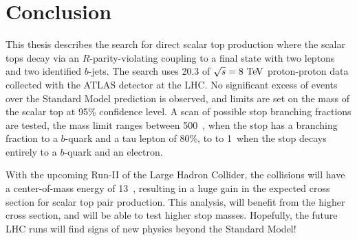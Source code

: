 \chapter[Conclusion][Conclusion]{Conclusion}

This thesis describes the search for direct scalar top production where the
scalar tops decay via an $R$-parity-violating coupling to a final state with
two leptons and two identified $b$-jets.
The search uses 20.3 \ifb of $\sqrt{s}=8 \TeV$ proton-proton data collected
with the ATLAS detector at the LHC.
No significant excess of events over the Standard Model prediction is observed,
and limits are set on the mass of the scalar top at 95\% confidence level.
A scan of possible stop branching fractions are tested, the mass limit ranges
between 500~\GeV, when the stop has a branching fraction to a $b$-quark and a
tau lepton of 80\%, to to 1~\TeV when the stop decays entirely to a $b$-quark
and an electron.

With the upcoming Run-II of the Large Hadron Collider, the collisions will have
a center-of-mass energy of 13~\TeV, resulting in a huge gain in the expected
cross section for scalar top pair production.
This analysis, will benefit from the higher cross section, and will be able to
test higher stop masses.
Hopefully, the future LHC runs will find signs of new physics beyond the
Standard Model!
